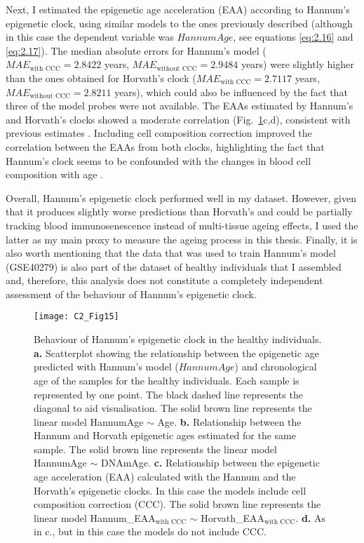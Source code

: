 \bigskip

Next, I estimated the epigenetic age acceleration (EAA) according to Hannum's epigenetic clock, using similar models to the ones previously described (although in this case the dependent variable was $HannumAge$, see equations \ref{eq:2.16} and \ref{eq:2.17}). The median absolute errors for Hannum's model ($MAE_{\text{with CCC}} = 2.8422$ years, $MAE_{\text{without CCC}} = 2.9484$ years) were slightly higher than the ones obtained for Horvath's clock ($MAE_{\text{with CCC}} = 2.7117$ years, $MAE_{\text{without CCC}} = 2.8211$ years), which could also be influenced by the fact that three of the model probes were not available. The EAAs estimated by Hannum's and Horvath's clocks showed a moderate correlation (Fig.~\ref{fig:c2_fig15}c,d), consistent with previous estimates \cite{Irvin2018}. Including cell composition correction improved the correlation between the EAAs from both clocks, highlighting the fact that Hannum's clock seems to be confounded with the changes in blood cell composition with age \cite{Marioni2015,Irvin2018}. 

\bigskip

Overall, Hannum's epigenetic clock performed well in my dataset. However, given that it produces slightly worse predictions than Horvath's and could be partially tracking blood immunosenescence instead of multi-tissue ageing effects, I used the latter as my main proxy to measure the ageing process in this thesis. Finally, it is also worth mentioning that the data that was used to train Hannum's model (GSE40279) is also part of the dataset of healthy individuals that I assembled and, therefore, this analysis does not constitute a completely independent assessment of the behaviour of Hannum's epigenetic clock.


\begin{figure}[htbp!] 
	\centering
	\texttt{[image: C2\_Fig15]}
	\vspace*{2mm}    
	\caption[Behaviour of Hannum's epigenetic clock in the healthy individuals]{Behaviour of Hannum's epigenetic clock in the healthy individuals. \textbf{a.} Scatterplot showing the relationship between the epigenetic age predicted with Hannum's model ($HannumAge$) \cite{Hannum2013} and chronological age of the samples for the healthy individuals. Each sample is represented by one point. The black dashed line represents the diagonal to aid visualisation. The solid brown line represents the linear model HannumAge $\sim$ Age. \textbf{b.} Relationship between the Hannum and Horvath epigenetic ages estimated for the same sample. The solid brown line represents the linear model HannumAge $\sim$ DNAmAge. \textbf{c.} Relationship between the epigenetic age acceleration (EAA) calculated with the Hannum and the Horvath's epigenetic clocks. In this case the models include cell composition correction (CCC). The solid brown line represents the linear model Hannum\_EAA$_{\text{with CCC}}$ $\sim$ Horvath\_EAA$_{\text{with CCC}}$. \textbf{d.} As in c., but in this case the models do not include CCC.}
	\label{fig:c2_fig15}
\end{figure}



